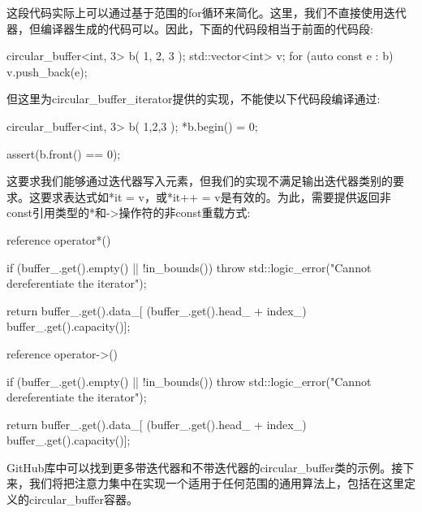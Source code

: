 这段代码实际上可以通过基于范围的for循环来简化。这里，我们不直接使用迭代器，但编译器生成的代码可以。因此，下面的代码段相当于前面的代码段:

\begin{cpp}
circular_buffer<int, 3> b({ 1, 2, 3 });
std::vector<int> v;
for (auto const e : b)
{
	v.push_back(e);
}
\end{cpp}

但这里为circular\_buffer\_iterator提供的实现，不能使以下代码段编译通过:

\begin{cpp}
circular_buffer<int, 3> b({ 1,2,3 });
*b.begin() = 0;

assert(b.front() == 0);
\end{cpp}

这要求我们能够通过迭代器写入元素，但我们的实现不满足输出迭代器类别的要求。这要求表达式如*it = v，或*it++ = v是有效的。为此，需要提供返回非const引用类型的*和->操作符的非const重载方式:

\begin{cpp}
reference operator*()
{
	if (buffer_.get().empty() || !in_bounds())
		throw std::logic_error("Cannot dereferentiate the
								iterator");
	
	return buffer_.get().data_[
		(buffer_.get().head_ + index_) %
		 buffer_.get().capacity()];
}

reference operator->()
{
	if (buffer_.get().empty() || !in_bounds())
		throw std::logic_error("Cannot dereferentiate the
								iterator");
								
	return buffer_.get().data_[
		(buffer_.get().head_ + index_) %
		 buffer_.get().capacity()];
}
\end{cpp}

GitHub库中可以找到更多带迭代器和不带迭代器的circular\_buffer类的示例。接下来，我们将把注意力集中在实现一个适用于任何范围的通用算法上，包括在这里定义的circular\_buffer容器。






















